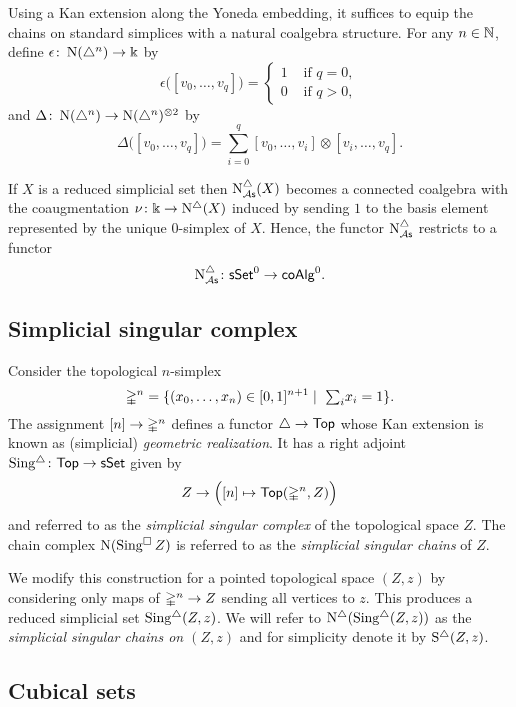 Using a Kan extension along the Yoneda embedding, it suffices to equip the chains on standard simplices with a natural coalgebra structure.
For any $n \in \mathbb{N}$, define $\epsilon \colon \operatorname{N}(\triangle^n) \to \Bbbk$ by
\[
\epsilon \big( [v_0, \dots, v_q] \big) = \begin{cases} 1 & \text{ if } q = 0, \\ 0 & \text{ if } q>0, \end{cases}
\]
and $\Delta \colon \operatorname{N}(\triangle^n) \to \operatorname{N}(\triangle^n)^{\otimes2}$ by
\[
\Delta \big( [v_0, \dots, v_q] \big) = \sum_{i=0}^q [v_0, \dots, v_i] \otimes [v_i, \dots, v_q].
\]

If $X$ is a reduced simplicial set then $\operatorname{N^{\triangle}_{{\mathcal{A}\mathsf{s}}}}(X)$ becomes a connected coalgebra with the coaugmentation $\nu \colon \Bbbk \to \operatorname{N^{\triangle}}(X)$ induced by sending $1$ to the basis element represented by the unique $0$-simplex of $X$.
Hence, the functor $\operatorname{N^{\triangle}_{{\mathcal{A}\mathsf{s}}}}$ restricts to a functor
\[
\operatorname{N^{\triangle}_{{\mathcal{A}\mathsf{s}}}} \colon \mathsf{sSet}^0 \to \mathsf{coAlg}^0.
\]

\subsection{Simplicial singular complex}

Consider the topological $n$-simplex
\[
\mathbb{\Delta}^{n} = \{(x_0, \dots, x_n) \in [0,1]^{n+1} \mid \ \textstyle{\sum}_i x_i = 1\}.
\]
The assignment $[n] \to \mathbb{\Delta}^n$ defines a functor $\triangle \to \mathsf{Top}$ whose Kan extension is known as (simplicial) \textit{geometric realization}.
It has a right adjoint $\operatorname{Sing^{\triangle}} \colon \mathsf{Top} \to \mathsf{sSet}$ given by
\[
Z \to \Big( [n] \mapsto \mathsf{Top}(\mathbb{\Delta}^n, Z) \Big)
\]
and referred to as the \textit{simplicial singular complex} of the topological space $Z$.
The chain complex $\operatorname{N}(\operatorname{Sing^{\square}} Z)$ is referred to as the \textit{simplicial singular chains} of $Z$.

We modify this construction for a pointed topological space $(Z, z)$ by considering only maps of $\mathbb{\Delta}^n \to Z$ sending all vertices to $z$.
This produces a reduced simplicial set $\operatorname{Sing^{\triangle}}(Z, z)$.
We will refer to $\operatorname{N^{\triangle}}(\operatorname{Sing^{\triangle}}(Z, z))$ as the \textit{simplicial singular chains on $(Z, z)$} and for simplicity denote it by $\operatorname{S^{\triangle}}(Z, z)$.

\subsection{Cubical sets} \label{ss:cubical sets}

